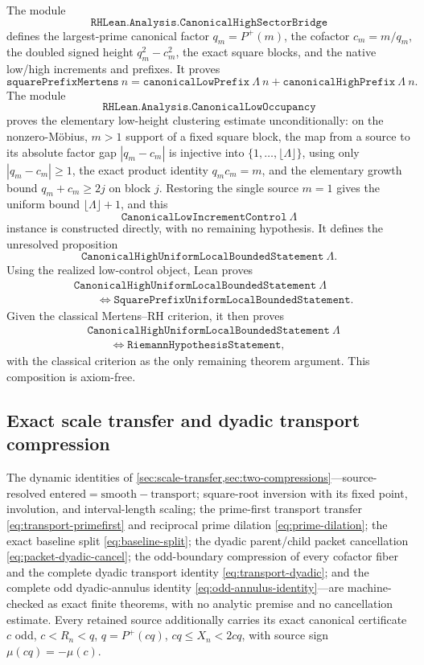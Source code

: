\documentclass[11pt]{article}
\theoremstyle{definition}
\theoremstyle{remark}
\newcommand{\Pplus}{P^{+}}
\newcommand{\1}{\mathbf{1}}
\begin{document}
The module
\[
 \texttt{RHLean.Analysis.CanonicalHighSectorBridge}
\]
defines the largest-prime canonical factor $q_m=\Pplus(m)$, the cofactor $c_m=m/q_m$, the doubled signed height $q_m^2-c_m^2$, the exact square blocks, and the native low/high increments and prefixes.  It proves
\[
 \texttt{squarePrefixMertens}\ n
 =
 \texttt{canonicalLowPrefix}\ \Lambda\ n
 +
 \texttt{canonicalHighPrefix}\ \Lambda\ n.
\]
The module
\[
 \texttt{RHLean.Analysis.CanonicalLowOccupancy}
\]
proves the elementary low-height clustering estimate unconditionally: on the nonzero-M\"obius, $m>1$ support of a fixed square block, the map from a source to its absolute factor gap $|q_m-c_m|$ is injective into $\{1,\dots,\lfloor\Lambda\rfloor\}$, using only $|q_m-c_m|\ge1$, the exact product identity $q_mc_m=m$, and the elementary growth bound $q_m+c_m\ge2j$ on block $j$.  Restoring the single source $m=1$ gives the uniform bound $\lfloor\Lambda\rfloor+1$, and this
\[
 \texttt{CanonicalLowIncrementControl}\ \Lambda
\]
instance is constructed directly, with no remaining hypothesis.  It defines the unresolved proposition
\[
 \texttt{CanonicalHighUniformLocalBoundedStatement}\ \Lambda.
\]
Using the realized low-control object, Lean proves
\[
 \begin{aligned}
 &\texttt{CanonicalHighUniformLocalBoundedStatement}\ \Lambda\\
 &\qquad\Longleftrightarrow
 \texttt{SquarePrefixUniformLocalBoundedStatement}.
 \end{aligned}
\]
Given the classical Mertens--RH criterion, it then proves
\[
 \boxed{
 \begin{aligned}
 &\texttt{CanonicalHighUniformLocalBoundedStatement}\ \Lambda\\
 &\qquad\Longleftrightarrow
 \texttt{RiemannHypothesisStatement},
 \end{aligned}
 }
\]
with the classical criterion as the only remaining theorem argument.  This composition is axiom-free.

\subsection{Exact scale transfer and dyadic transport compression}

The dynamic identities of \cref{sec:scale-transfer,sec:two-compressions}---source-resolved $\text{entered}=\text{smooth}-\text{transport}$; square-root inversion with its fixed point, involution, and interval-length scaling; the prime-first transport transfer \eqref{eq:transport-primefirst} and reciprocal prime dilation \eqref{eq:prime-dilation}; the exact baseline split \eqref{eq:baseline-split}; the dyadic parent/child packet cancellation \eqref{eq:packet-dyadic-cancel}; the odd-boundary compression of every cofactor fiber and the complete dyadic transport identity \eqref{eq:transport-dyadic}; and the complete odd dyadic-annulus identity \eqref{eq:odd-annulus-identity}---are machine-checked as exact finite theorems, with no analytic premise and no cancellation estimate.  Every retained source additionally carries its exact canonical certificate $c$ odd, $c<R_n<q$, $q=\Pplus(cq)$, $cq\le X_n<2cq$, with source sign $\mu(cq)=-\mu(c)$.
\end{document}
